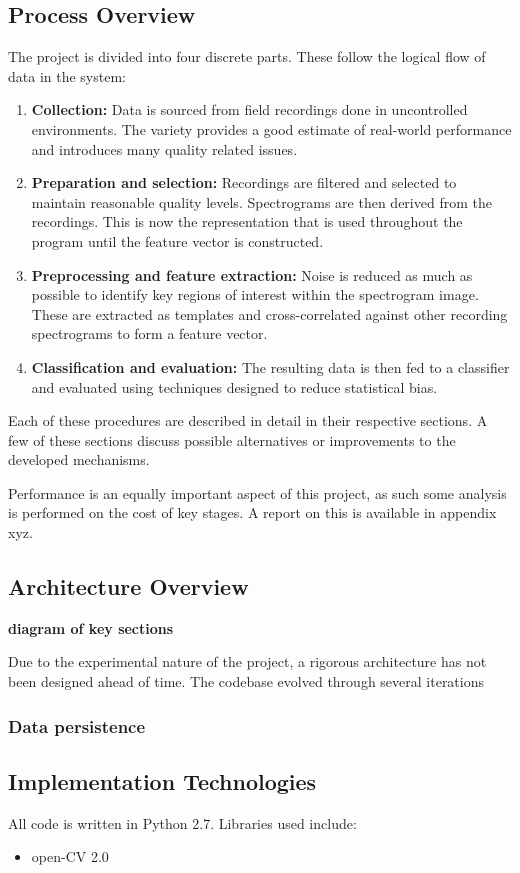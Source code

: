 \subsection{Process Overview}
The project is divided into four discrete parts.
These follow the logical flow of data in the system:
\begin{enumerate}
  \item \textbf{Collection:}
    Data is sourced from field recordings done in uncontrolled environments.
    The variety provides a good estimate of real-world performance and
    introduces many quality related issues.

  \item \textbf{Preparation and selection:}
    Recordings are filtered and selected to maintain reasonable quality levels.
    Spectrograms are then derived from the recordings.
    This is now the representation that is used throughout the program until
    the feature vector is constructed.

  \item \textbf{Preprocessing and feature extraction:}
    Noise is reduced as much as possible to identify key regions of interest
    within the spectrogram image.
    These are extracted as templates and cross-correlated against other
    recording spectrograms to form a feature vector.

  \item \textbf{Classification and evaluation:}
    The resulting data is then fed to a classifier and evaluated using techniques
    designed to reduce statistical bias.
\end{enumerate}

Each of these procedures are described in detail in their respective sections.
A few of these sections discuss possible alternatives or improvements to the
developed mechanisms.

Performance is an equally important aspect of this project, as such some
analysis is performed on the cost of key stages.
A report on this is available in appendix xyz.

\subsection{Architecture Overview}
\textbf{diagram of key sections}

Due to the experimental nature of the project, a rigorous architecture has not
been designed ahead of time.
The codebase evolved through several iterations 

\subsubsection{Data persistence}


\subsection{Implementation Technologies}
All code is written in Python 2.7.
Libraries used include:
\begin{itemize}
  \item open-CV 2.0
\end{itemize}
